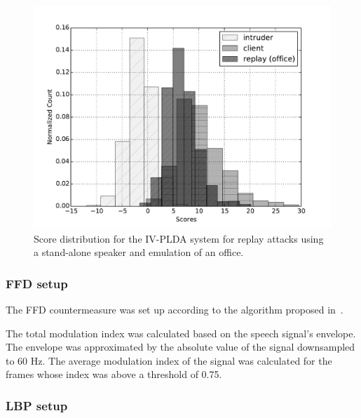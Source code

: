 \begin{figure}
	\centering
	\begin{minipage}{.5\textwidth}
	\includegraphics[width=1\linewidth]{Figs/dist_IV_off.pdf}
	\end{minipage}

%

	\caption{Score distribution for the IV-PLDA system for replay attacks using a stand-alone speaker and emulation of an office.}
	\label{fig::Dist_IV}
\end{figure}

\subsubsection{FFD setup} The FFD countermeasure was set up according to the algorithm proposed in~\cite{Villalba2011}. 

The total modulation index was calculated based on the speech signal's envelope. The envelope was approximated by the absolute value of the signal downsampled to 60 Hz. The average modulation index of the signal was calculated for
the frames whose index was above a threshold of 0.75. 




\subsubsection{LBP setup} 


